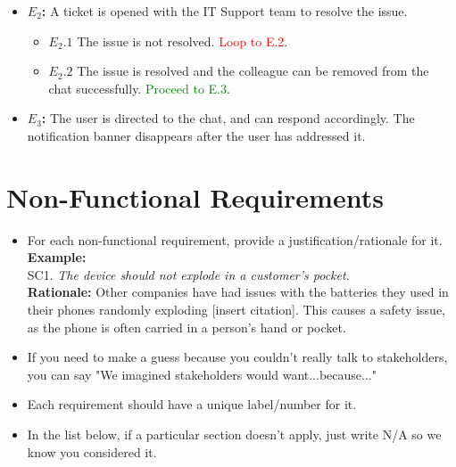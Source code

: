 \documentclass[]{article}
\begin{document}
\begin{enumerate}[\bf {BE}11.]
{{\begin{itemize}
                    \item {\bf $E_{2}$:}  A ticket is opened with the IT Support team to resolve the issue.
                    \begin{itemize}
                        \item {\bf $E_{2}.1$} The issue is not resolved. \textcolor{red}{Loop to E.2}.
                        \item {\bf $E_{2}.2$} The issue is resolved and the colleague can be removed from the chat successfully. \textcolor{green}{Proceed to E.3}.
                    \end{itemize}
					\item {\bf $E_{3}$:}  The user is directed to the chat, and can respond accordingly. The notification banner disappears after the user has addressed it.
			\end{itemize}
				
			}%
		}%
		\end{enumerate}
		

\section{Non-Functional Requirements}
\label{sec:non-functional_requirements}

\begin{itemize}
    \item For each non-functional requirement, provide a justification/rationale for it.\\
    {\bf Example:} \\
    SC1. \emph{The device should not explode in a customer’s pocket.}\\
    {\bf Rationale:} Other companies have had issues with the batteries they used in their phones randomly exploding [insert citation]. This causes a safety issue, as the phone is often carried in a person's hand or pocket. 
    \item If you need to make a guess because you couldn't really talk to stakeholders, you can say "We imagined stakeholders would want...because..."
    \item Each requirement should have a unique label/number for it.
    \item In the list below, if a particular section doesn't apply, just write N/A so we know you considered it.
\end{itemize}
\end{document}
